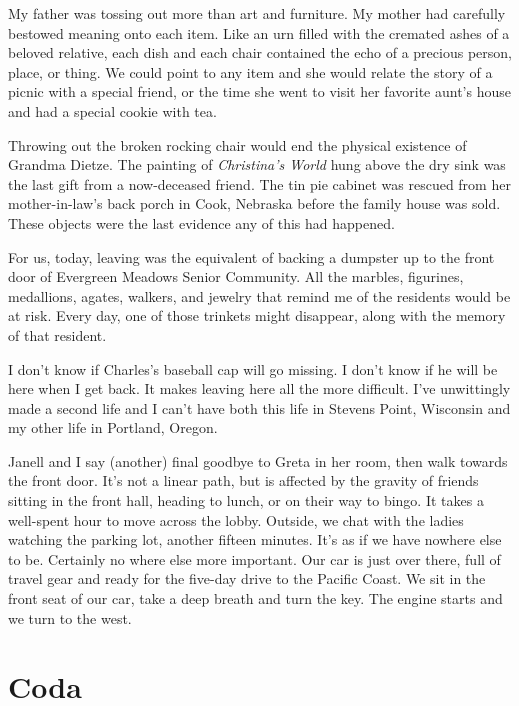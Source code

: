 \documentclass[
  letterpaper,
  DIV=11,
  numbers=noendperiod]{scrreprt}
\begin{document}
My father was tossing out more than art and furniture. My mother had
carefully bestowed meaning onto each item. Like an urn filled with the
cremated ashes of a beloved relative, each dish and each chair contained
the echo of a precious person, place, or thing. We could point to any
item and she would relate the story of a picnic with a special friend,
or the time she went to visit her favorite aunt's house and had a
special cookie with tea.

Throwing out the broken rocking chair would end the physical existence
of Grandma Dietze. The painting of \emph{Christina's World} hung above
the dry sink was the last gift from a now-deceased friend. The tin pie
cabinet was rescued from her mother-in-law's back porch in Cook,
Nebraska before the family house was sold. These objects were the last
evidence any of this had happened.

For us, today, leaving was the equivalent of backing a dumpster up to
the front door of Evergreen Meadows Senior Community. All the marbles,
figurines, medallions, agates, walkers, and jewelry that remind me of
the residents would be at risk. Every day, one of those trinkets might
disappear, along with the memory of that resident.

I don't know if Charles's baseball cap will go missing. I don't know if
he will be here when I get back. It makes leaving here all the more
difficult. I've unwittingly made a second life and I can't have both
this life in Stevens Point, Wisconsin and my other life in Portland,
Oregon.

Janell and I say (another) final goodbye to Greta in her room, then walk
towards the front door. It's not a linear path, but is affected by the
gravity of friends sitting in the front hall, heading to lunch, or on
their way to bingo. It takes a well-spent hour to move across the lobby.
Outside, we chat with the ladies watching the parking lot, another
fifteen minutes. It's as if we have nowhere else to be. Certainly no
where else more important. Our car is just over there, full of travel
gear and ready for the five-day drive to the Pacific Coast. We sit in
the front seat of our car, take a deep breath and turn the key. The
engine starts and we turn to the west.


\chapter*{Coda}\label{coda}
\end{document}
